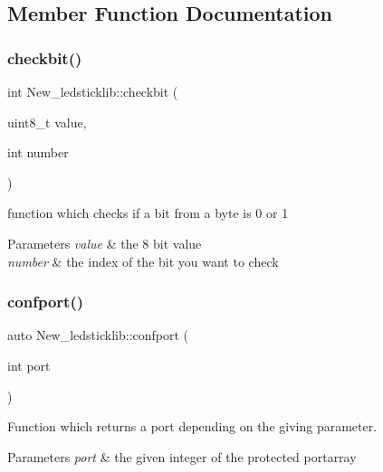 \subsection{Member Function Documentation}
\mbox{\label{class_new__ledsticklib_a8454428b9f9401eb1c7b93a006326a45}} 
\subsubsection{\texorpdfstring{checkbit()}{checkbit()}}
{\footnotesize\ttfamily int New\+\_\+ledsticklib\+::checkbit (\begin{DoxyParamCaption}\item[{uint8\+\_\+t}]{value,  }\item[{int}]{number }\end{DoxyParamCaption})\hspace{0.3cm}{\ttfamily [protected]}}



function which checks if a bit from a byte is 0 or 1 


\begin{DoxyParams}{Parameters}
{\em value} & the 8 bit value \\
\hline
{\em number} & the index of the bit you want to check \\
\hline
\end{DoxyParams}
\mbox{\label{class_new__ledsticklib_aa6300ac04c675a3e4b2c21ae2ef83af7}} 
\subsubsection{\texorpdfstring{confport()}{confport()}}
{\footnotesize\ttfamily auto New\+\_\+ledsticklib\+::confport (\begin{DoxyParamCaption}\item[{int}]{port }\end{DoxyParamCaption})\hspace{0.3cm}{\ttfamily [protected]}}



Function which returns a port depending on the giving parameter. 


\begin{DoxyParams}{Parameters}
{\em port} & the given integer of the protected portarray \\
\hline
\end{DoxyParams}
\mbox{\label{class_new__ledsticklib_a2c960f7c1f576f088cafe0b1c9630c86}} 
